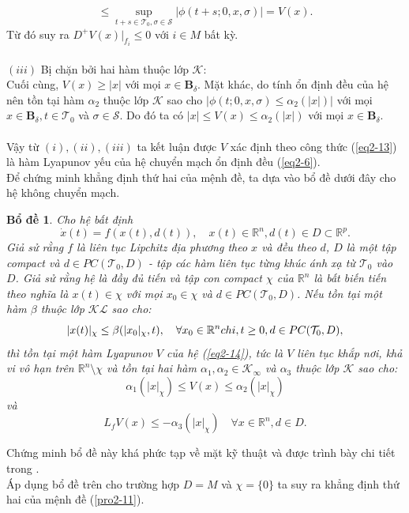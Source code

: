 \documentclass[14pt,a4paper,oneside]{report}		%
\newtheorem{lemma}[theorem]{Bổ đề}
\theoremstyle{definition}
\begin{document}
$$\leq\sup_{t+s\in\mathcal{T}_0,\sigma\in\mathcal{S}}|\phi(t+s;0,x,\sigma)|=V(x).$$
Từ đó suy ra $D^+V(x)|_{f_i}\leq 0$ với $i\in M$ bất kỳ.\\\\
$(iii)$ Bị chặn bởi hai hàm thuộc lớp $\mathcal{K}$:\\
Cuối cùng, $V(x)\geq |x|$ với mọi $x\in\mathbf{B}_\delta$. Mặt khác, do tính ổn định đều của hệ nên tồn tại hàm $\alpha_2$ thuộc lớp $\mathcal{K}$ sao cho $|\phi(t;0,x,\sigma)\leq\alpha_2(|x|)|$ với mọi $x\in\mathbf{B}_\delta, t\in\mathcal{T}_0$ và $\sigma\in\mathcal{S}$. Do đó ta có $|x|\leq V(x)\leq\alpha_2(|x|)$ với mọi $x\in\mathbf{B}_\delta$.\\\\
Vậy từ $(i),(ii),(iii)$ ta kết luận được $V$ xác định theo công thức (\ref{eq2-13}) là hàm Lyapunov yếu của hệ chuyển mạch ổn định đều (\ref{eq2-6}).\\

Để chứng minh khẳng định thứ hai của mệnh đề, ta dựa vào bổ đề dưới đây cho hệ không chuyển mạch.

\begin{lemma}
Cho hệ bất định
\begin{equation} \label{eq2-14}
\dot{x}(t)=f(x(t),d(t)),\quad x(t)\in\mathbb{R}^n,d(t)\in D\subset\mathbb{R}^p.
\end{equation}
Giả sử rằng $f$ là liên tục Lipchitz địa phương theo $x$ và đều theo $d$, $D$ là một tập compact và $d\in PC(\mathcal{T}_0,D)$ - tập các hàm liên tục từng khúc ánh xạ từ $\mathcal{T}_0$ vào $D$. Giả sử rằng hệ là đầy đủ tiến và tập con compact $\chi$ của $\mathbb{R}^n$ là bất biến tiến theo nghĩa là $x(t) \in \chi$ với mọi $x_0\in\chi$ và $d\in PC(\mathcal{T}_0,D)$. Nếu tồn tại một hàm $\beta$ thuộc lớp $\mathcal{KL}$ sao cho:
\begin{equation} \label{eq2-15}
|x(t)|_\chi \leq\beta(|x_0|_\chi,t),\quad\forall x_0\in\mathbb{R}^n\\chi, t\geq 0,d\in PC(\mathcal{T}_0,D),
\end{equation}
thì tồn tại một hàm Lyapunov $V$ của hệ (\ref{eq2-14}), tức là $V$ liên tục khắp nơi, khả vi vô hạn trên $\mathbb{R}^n \setminus \chi$ và tồn tại hai hàm $\alpha_1,\alpha_2\in\mathcal{K}_\infty$ và $\alpha_3$ thuộc lớp $\mathcal{K}$ sao cho:
$$\alpha_1(|x|_\chi)\leq V(x)\leq\alpha_2(|x|_\chi)$$
và
$$L_fV(x)\leq -\alpha_3(|x|_\chi) \quad \forall x\in\mathbb{R}^n,d\in D.$$
\end{lemma}

Chứng minh bổ đề này khá phức tạp về mặt kỹ thuật và được trình bày chi tiết trong \cite{DATN1, DATN2}.\\
Áp dụng bổ đề trên cho trường hợp $D=M$ và $\chi=\{0\}$ ta suy ra khẳng định thứ hai của mệnh đề (\ref{pro2-11}).\\
\end{document}
